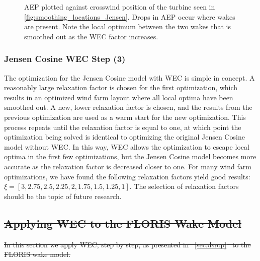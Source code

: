 \documentclass[a4paper]{jpconf}
\providecommand{\DIFdel}[1]{{\protect\color{red}\sout{#1}}}                      %
\providecommand{\DIFdelbegin}{} %
\newcommand{\DIFscaledelfig}{0.5}
\newlength{\DIFdelgraphicswidth} %
\newlength{\DIFdelgraphicsheight} %
\newcommand{\DIFdelincludegraphics}[2][]{%
\sbox{\DIFdelgraphicsbox}{\DIFOincludegraphics[#1]{#2}}%
\settoboxwidth{\DIFdelgraphicswidth}{\DIFdelgraphicsbox} %
\settoboxtotalheight{\DIFdelgraphicsheight}{\DIFdelgraphicsbox} %
\scalebox{\DIFscaledelfig}{%
\parbox[b]{\DIFdelgraphicswidth}{\usebox{\DIFdelgraphicsbox}\\[-\baselineskip] \rule{\DIFdelgraphicswidth}{0em}}\llap{\resizebox{\DIFdelgraphicswidth}{\DIFdelgraphicsheight}{%
\setlength{\unitlength}{\DIFdelgraphicswidth}%
\begin{picture}(1,1)%
\thicklines\linethickness{2pt} %
{\color[rgb]{1,0,0}\put(0,0){\framebox(1,1){}}}%
{\color[rgb]{1,0,0}\put(0,0){\line( 1,1){1}}}%
{\color[rgb]{1,0,0}\put(0,1){\line(1,-1){1}}}%
\end{picture}%
}\hspace*{3pt}}} %
} %
\DeclareRobustCommand{\DIFdelbegin}{\DIFOdelbegin \let\includegraphics\DIFdelincludegraphics} %
\begin{document}
\begin{figure}[ht]
\begin{minipage}[t]{0.52\textwidth}
		\caption{AEP plotted against crosswind position of the turbine seen in \cref{fig:smoothing_locations_Jensen}. Drops in AEP occur where wakes are present. Note the local optimum between the two wakes that is smoothed out as the WEC factor increases.}
		\label{fig:JensenLocalOptSmoothed}
	\end{minipage}
\end{figure}

\subsubsection{Jensen Cosine WEC Step (3)}

The optimization for the Jensen Cosine model with WEC is simple in concept. A reasonably large relaxation factor is chosen for the first optimization, which results in an optimized wind farm layout where all local optima have been smoothed out. A new, lower relaxation factor is chosen, and the results from the previous optimization are used as a warm start for the new optimization. This process repeats until the relaxation factor is equal to one, at which point the optimization being solved is identical to optimizing the original Jensen Cosine model without WEC. In this way, WEC allows the optimization to escape local optima in the first few optimizations, but the Jensen Cosine model becomes more accurate as the relaxation factor is decreased closer to one. For many wind farm optimizations, we have found the following relaxation factors yield good results: $\xi = [3, 2.75, 2.5, 2.25, 2, 1.75, 1.5, 1.25, 1]$. The selection of relaxation factors should be the topic of future research.


\DIFdelbegin \subsection{\DIFdel{Applying WEC to the FLORIS Wake Model}}
\addtocounter{subsection}{-1}%
\DIFdel{In this section we apply WEC, step by step, as presented in \mbox{%
\cref{sec:dsrop} }\hspace{0pt}%
to the FLORIS wake model.  
}%
\end{document}
